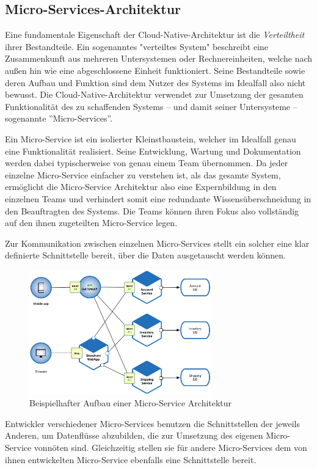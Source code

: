 \subsection{Micro-Services-Architektur}

Eine fundamentale Eigenschaft der Cloud-Native-Architektur ist die \textit{Verteiltheit} ihrer Bestandteile. Ein sogenanntes "verteiltes System" beschreibt eine Zusammenkunft aus mehreren Untersystemen oder Rechnereinheiten, welche nach außen hin wie eine abgeschlossene Einheit funktioniert. Seine Bestandteile sowie deren Aufbau und Funktion sind dem Nutzer des Systems im Idealfall also nicht bewusst. Die Cloud-Native-Architektur verwendet zur Umsetzung der gesamten Funktionalität des zu schaffenden Systems -- und damit seiner Untersysteme -- sogenannte ''Micro-Services''.

Ein Micro-Service ist ein isolierter Kleinstbaustein, welcher im Idealfall genau eine Funktionalität realisiert. Seine Entwicklung, Wartung und Dokumentation werden dabei typischerweise von genau einem Team übernommen. Da jeder einzelne Micro-Service einfacher zu verstehen ist, als das gesamte System, ermöglicht die Micro-Service Architektur also eine Expernbildung in den einzelnen Teams und verhindert somit eine redundante Wissensüberschneidung in den Beauftragten des Systems. Die Teams können ihren Fokus also vollständig auf den ihnen zugeteilten Micro-Service legen.

Zur Kommunikation zwischen einzelnen Micro-Services stellt ein solcher eine klar definierte Schnittstelle bereit, über die Daten ausgetauscht werden können.
\cite{chris_richardson_microservices_nodate}
\begin{figure}[H] 
  \centering
  \includegraphics[width=0.7\textwidth]{Chapters/2-Grundlagen/Graphics/Microservice_Architecture.png}
  \caption{Beispielhafter Aufbau einer Micro-Service Architektur \cite{chris_richardson_microservices_nodate}}
  \label{fig:microservices}
\end{figure}
Entwickler verschiedener Micro-Services benutzen die Schnittstellen der jeweils Anderen, um Datenflüsse abzubilden, die zur Umsetzung des eigenen Micro-Service vonnöten sind. Gleichzeitig stellen sie für andere Micro-Services dem von ihnen entwickelten Micro-Service ebenfalls eine Schnittstelle bereit. 

